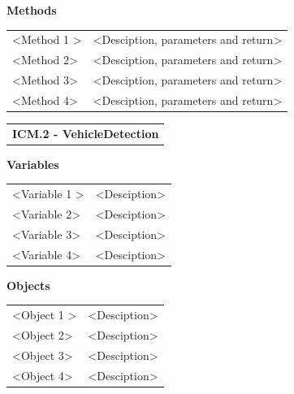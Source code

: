 \documentclass [10pt]{article}
\begin{document}
\textbf{Methods} 
\begin{longtable}{ p{ }  p{ }} \\ 

 
\rowcolor{tableCell} <Method 1 >& <Desciption, parameters and return>\\ 
<Method 2>& <Desciption, parameters and return>\\

\rowcolor{tableCell}<Method 3> & <Desciption, parameters and return> \\ 
<Method 4>& <Desciption, parameters and return> \\

\end{longtable}





\begin{longtable}{p{}}
\rowcolor{subsectionC}\textbf{ICM.2 - VehicleDetection} \\
\end{longtable}
  

\textbf{Variables} 

\begin{longtable}{ p{ }  p{ }} \\ 

 
\rowcolor{tableCell} <Variable 1 >& <Desciption> \\ 
<Variable 2>& <Desciption> \\

\rowcolor{tableCell}<Variable 3> & <Desciption> \\ 
<Variable 4>& <Desciption> \\

\end{longtable}

\textbf{Objects} 
\begin{longtable}{ p{ }  p{ }} \\ 

 
\rowcolor{tableCell} <Object 1 >& <Desciption> \\ 
<Object 2>& <Desciption> \\

\rowcolor{tableCell}<Object 3> & <Desciption> \\ 
<Object 4>& <Desciption> \\

\end{longtable}
\end{document}
